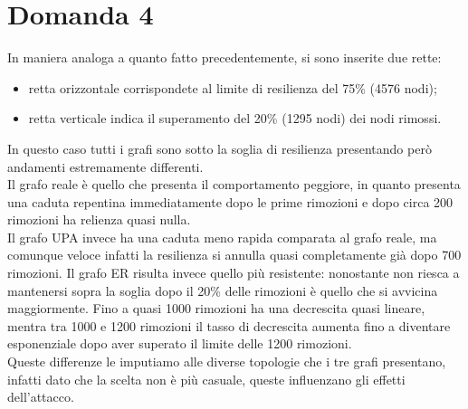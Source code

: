 \documentclass{article}
\begin{document}
\section*{Domanda 4}
In maniera analoga a quanto fatto precedentemente, si sono inserite due rette:
\begin{itemize}
	\item retta orizzontale corrispondete al limite di resilienza del 75\% (4576 nodi);
	\item retta verticale indica il superamento del 20\% (1295 nodi) dei nodi rimossi. 
\end{itemize}
In questo caso tutti i grafi sono sotto la soglia di resilienza presentando però andamenti estremamente differenti.\\
Il grafo reale è quello che presenta il comportamento peggiore, in quanto presenta una caduta repentina immediatamente dopo le prime rimozioni e dopo circa 200 rimozioni ha relienza quasi nulla.\\
Il grafo UPA invece ha una caduta meno rapida comparata al grafo reale, ma comunque veloce infatti la resilienza si annulla quasi completamente già dopo 700 rimozioni.
Il grafo ER risulta invece quello più resistente: nonostante non riesca a mantenersi sopra la soglia dopo il 20\% delle rimozioni è quello che si avvicina maggiormente. Fino a quasi 1000 rimozioni ha una decrescita quasi lineare, mentra tra 1000 e 1200 rimozioni il tasso di decrescita aumenta fino a diventare esponenziale dopo aver superato il limite delle 1200 rimozioni.\\
Queste differenze le imputiamo alle diverse topologie che i tre grafi presentano, infatti dato che la scelta non è più casuale, queste influenzano gli effetti dell'attacco.\\
\end{document}
